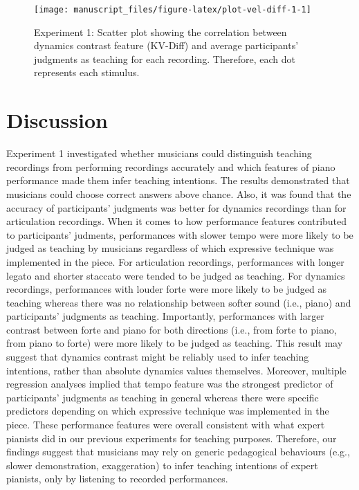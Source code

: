 \documentclass[
  man,floatsintext]{apa6}
\begin{document}
\begin{figure}

{\centering \texttt{[image: manuscript\_files/figure-latex/plot-vel-diff-1-1]} 

}

\caption{\label{fig:vel-diff-1}Experiment 1: Scatter plot showing the correlation between dynamics contrast feature (KV-Diff) and average participants' judgments as teaching for each recording. Therefore, each dot represents each stimulus.}\label{fig:plot-vel-diff-1}
\end{figure}

\clearpage

\hypertarget{discussion}{%
\section{Discussion}\label{discussion}}

Experiment 1 investigated whether musicians could distinguish teaching recordings from performing recordings accurately and which features of piano performance made them infer teaching intentions. The results demonstrated that musicians could choose correct answers above chance. Also, it was found that the accuracy of participants' judgments was better for dynamics recordings than for articulation recordings. When it comes to how performance features contributed to participants' judments, performances with slower tempo were more likely to be judged as teaching by musicians regardless of which expressive technique was implemented in the piece. For articulation recordings, performances with longer legato and shorter staccato were tended to be judged as teaching. For dynamics recordings, performances with louder forte were more likely to be judged as teaching whereas there was no relationship between softer sound (i.e., piano) and participants' judgments as teaching. Importantly, performances with larger contrast between forte and piano for both directions (i.e., from forte to piano, from piano to forte) were more likely to be judged as teaching. This result may suggest that dynamics contrast might be reliably used to infer teaching intentions, rather than absolute dynamics values themselves. Moreover, multiple regression analyses implied that tempo feature was the strongest predictor of participants' judgments as teaching in general whereas there were specific predictors depending on which expressive technique was implemented in the piece. These performance features were overall consistent with what expert pianists did in our previous experiments for teaching purposes. Therefore, our findings suggest that musicians may rely on generic pedagogical behaviours (e.g., slower demonstration, exaggeration) to infer teaching intentions of expert pianists, only by listening to recorded performances.
\end{document}
